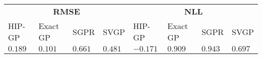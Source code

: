 \begin{tabular}{llllllll}
    \toprule
     \multicolumn{4}{c}{\textbf{RMSE}}  & \multicolumn{4}{c}{\textbf{NLL}}\\
    \cmidrule(r){1-4} \cmidrule{5-8} 
    HIP-GP  & Exact GP & SGPR  & SVGP  &  HIP-GP  & Exact GP & SGPR  & SVGP \\
    \midrule 
    $0.189 $ & $\mathbf{0.101}$ & $0.661 $ & 
    $0.481$ & $\mathbf{-0.171} $ & $0.909 $ &$0.943$ & $0.697$ \\
    \bottomrule
    \end{tabular}